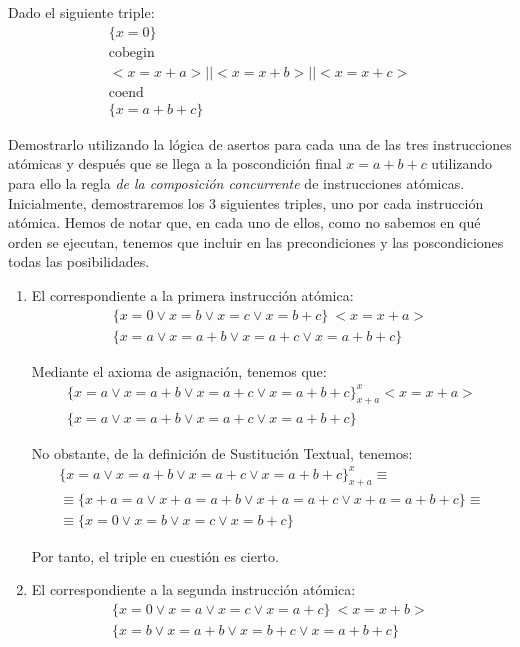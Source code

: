 \begin{ejercicio}
    Dado el siguiente triple:
    \begin{gather*}
        \{x = 0\} \\
        \text{cobegin} \\
        <x = x + a> || <x = x + b> || <x = x + c> \\
        \text{coend} \\
        \{x = a + b + c\}
    \end{gather*}
    
    Demostrarlo utilizando la lógica de asertos para cada una de las tres instrucciones atómicas y después que se llega a la poscondición final $x = a + b + c$ utilizando para ello la regla \emph{de la composición concurrente} de instrucciones atómicas.\\

Inicialmente, demostraremos los $3$ siguientes triples, uno por cada instrucción atómica. Hemos de notar que, en cada uno de ellos, como no sabemos en qué orden se ejecutan, tenemos que incluir en las precondiciones y las poscondiciones todas las posibilidades.
\begin{enumerate}
    \item El correspondiente a la primera instrucción atómica:
    \begin{gather*}
        \{x=0 \lor x=b \lor x=c \lor x=b+c\}\ <x=x+a>\ \\ \{x=a \lor x=a+b \lor x=a+c \lor x=a+b+c\}
    \end{gather*}

    Mediante el axioma de asignación, tenemos que:
    \begin{gather*}
        \{x=a \lor x=a+b \lor x=a+c \lor x=a+b+c\}_{x+a}^x <x=x+a>\\ \{x=a \lor x=a+b \lor x=a+c \lor x=a+b+c\}
    \end{gather*}

    No obstante, de la definición de Sustitución Textual, tenemos:
    \begin{gather*}
        \{x=a \lor x=a+b \lor x=a+c \lor x=a+b+c\}_{x+a}^x \equiv \\
        \equiv \{x+a=a \lor x+a=a+b \lor x+a=a+c \lor x+a=a+b+c\} \equiv \\
        \equiv \{x=0 \lor x=b \lor x=c \lor x=b+c\}
    \end{gather*}

    Por tanto, el triple en cuestión es cierto.

    \item El correspondiente a la segunda instrucción atómica:
    \begin{gather*}
        \{x=0 \lor x=a \lor x=c \lor x=a+c\}\ <x=x+b>\ \\ \{x=b \lor x=a+b \lor x=b+c \lor x=a+b+c\}
    \end{gather*}


\end{enumerate}
\end{ejercicio}
